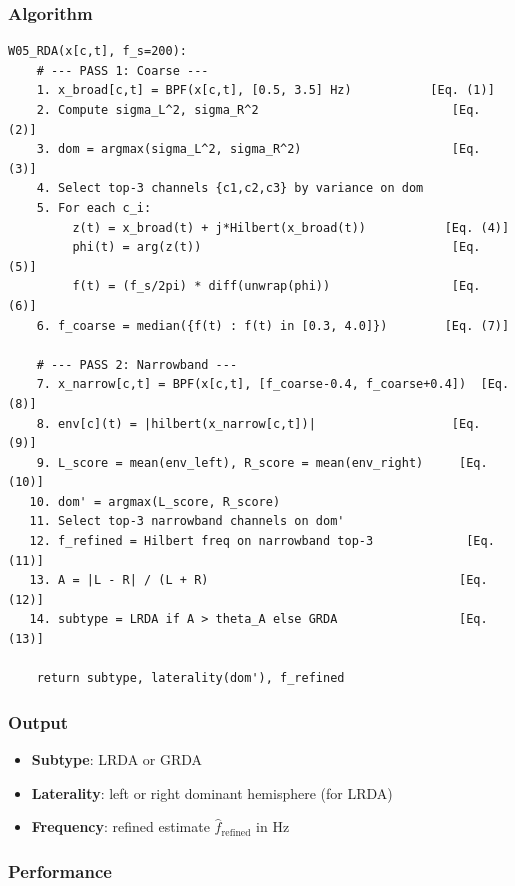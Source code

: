 \subsubsection{Algorithm}

\begin{verbatim}
W05_RDA(x[c,t], f_s=200):
    # --- PASS 1: Coarse ---
    1. x_broad[c,t] = BPF(x[c,t], [0.5, 3.5] Hz)           [Eq. (1)]
    2. Compute sigma_L^2, sigma_R^2                           [Eq. (2)]
    3. dom = argmax(sigma_L^2, sigma_R^2)                     [Eq. (3)]
    4. Select top-3 channels {c1,c2,c3} by variance on dom
    5. For each c_i:
         z(t) = x_broad(t) + j*Hilbert(x_broad(t))           [Eq. (4)]
         phi(t) = arg(z(t))                                   [Eq. (5)]
         f(t) = (f_s/2pi) * diff(unwrap(phi))                 [Eq. (6)]
    6. f_coarse = median({f(t) : f(t) in [0.3, 4.0]})        [Eq. (7)]

    # --- PASS 2: Narrowband ---
    7. x_narrow[c,t] = BPF(x[c,t], [f_coarse-0.4, f_coarse+0.4])  [Eq. (8)]
    8. env[c](t) = |hilbert(x_narrow[c,t])|                   [Eq. (9)]
    9. L_score = mean(env_left), R_score = mean(env_right)     [Eq. (10)]
   10. dom' = argmax(L_score, R_score)
   11. Select top-3 narrowband channels on dom'
   12. f_refined = Hilbert freq on narrowband top-3             [Eq. (11)]
   13. A = |L - R| / (L + R)                                   [Eq. (12)]
   14. subtype = LRDA if A > theta_A else GRDA                 [Eq. (13)]

    return subtype, laterality(dom'), f_refined
\end{verbatim}

\subsubsection{Output}

\begin{itemize}
  \item \textbf{Subtype}: LRDA or GRDA
  \item \textbf{Laterality}: left or right dominant hemisphere (for LRDA)
  \item \textbf{Frequency}: refined estimate $\hat{f}_{\mathrm{refined}}$ in Hz
\end{itemize}

\subsubsection{Performance}

